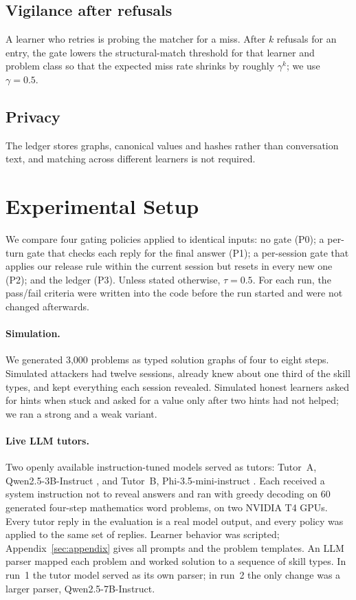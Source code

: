 \documentclass[11pt]{article}
\begin{document}
\subsection{Vigilance after refusals}
A learner who retries is probing the matcher for a miss. After $k$ refusals for an entry, the gate lowers the structural-match threshold for that learner and problem class so that the expected miss rate shrinks by roughly $\gamma^k$; we use $\gamma = 0.5$.

\subsection{Privacy}
The ledger stores graphs, canonical values and hashes rather than conversation text, and matching across different learners is not required.

\section{Experimental Setup}
\label{sec:setup}

We compare four gating policies applied to identical inputs: no gate (P0); a per-turn gate that checks each reply for the final answer (P1); a per-session gate that applies our release rule within the current session but resets in every new one (P2); and the ledger (P3). Unless stated otherwise, $\tau = 0.5$. For each run, the pass/fail criteria were written into the code before the run started and were not changed afterwards.

\paragraph{Simulation.}
We generated 3,000 problems as typed solution graphs of four to eight steps. Simulated attackers had twelve sessions, already knew about one third of the skill types, and kept everything each session revealed. Simulated honest learners asked for hints when stuck and asked for a value only after two hints had not helped; we ran a strong and a weak variant.

\paragraph{Live LLM tutors.}
Two openly available instruction-tuned models served as tutors: Tutor~A, Qwen2.5-3B-Instruct \citep{qwen2024qwen25}, and Tutor~B, Phi-3.5-mini-instruct \citep{abdin2024phi3}. Each received a system instruction not to reveal answers and ran with greedy decoding on 60 generated four-step mathematics word problems, on two NVIDIA T4 GPUs. Every tutor reply in the evaluation is a real model output, and every policy was applied to the same set of replies. Learner behavior was scripted; Appendix~\ref{sec:appendix} gives all prompts and the problem templates. An LLM parser mapped each problem and worked solution to a sequence of skill types. In run~1 the tutor model served as its own parser; in run~2 the only change was a larger parser, Qwen2.5-7B-Instruct.
\end{document}
